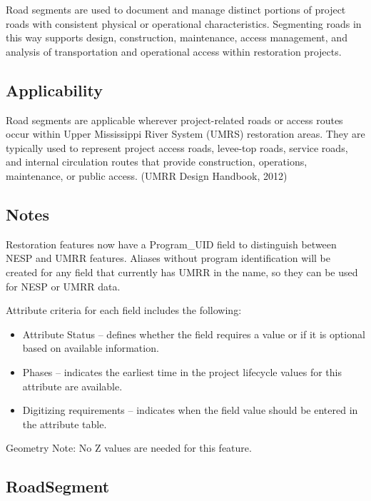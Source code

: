 \documentclass[
  letterpaper,
  DIV=11,
  numbers=noendperiod]{scrreprt}
\providecommand{\tightlist}{%
  \setlength{\itemsep}{0pt}\setlength{\parskip}{0pt}}
\begin{document}
Road segments are used to document and manage distinct portions of
project roads with consistent physical or operational characteristics.
Segmenting roads in this way supports design, construction, maintenance,
access management, and analysis of transportation and operational access
within restoration projects.

\subsection{Applicability}\label{applicability-23}

Road segments are applicable wherever project-related roads or access
routes occur within Upper Mississippi River System (UMRS) restoration
areas. They are typically used to represent project access roads,
levee-top roads, service roads, and internal circulation routes that
provide construction, operations, maintenance, or public access. (UMRR
Design Handbook, 2012)

\subsection{Notes}\label{notes-26}

Restoration features now have a Program\_UID field to distinguish
between NESP and UMRR features. Aliases without program identification
will be created for any field that currently has UMRR in the name, so
they can be used for NESP or UMRR data.

Attribute criteria for each field includes the following:

\begin{itemize}
\tightlist
\item
  Attribute Status -- defines whether the field requires a value or if
  it is optional based on available information.
\item
  Phases -- indicates the earliest time in the project lifecycle values
  for this attribute are available.
\item
  Digitizing requirements -- indicates when the field value should be
  entered in the attribute table.
\end{itemize}

Geometry Note: No Z values are needed for this feature.

\subsection{RoadSegment}\label{roadsegment}
\end{document}
